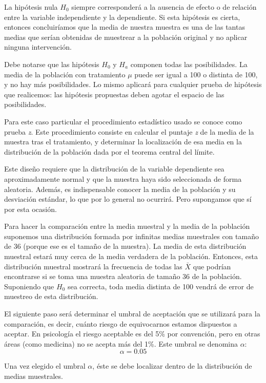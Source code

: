 \documentclass[a4paper,12pt]{article}
\begin{document}
La hipótesis nula $H_{0}$ siempre corresponderá a la ausencia de efecto o de relación entre la variable independiente y la dependiente. Si esta hipótesis es cierta, entonces concluiríamos que la media de nuestra muestra es una de las tantas medias que serían obtenidas de muestrear a la población original y no aplicar ninguna intervención.

Debe notarse que las hipótesis $H_{0}$ y $H_{a}$ componen todas las posibilidades. La media de la población con tratamiento $\mu$ puede ser igual a 100 o distinta de 100, y no hay más posibilidades. Lo mismo aplicará para cualquier prueba de hipótesis que realicemos: las hipótesis propuestas deben agotar el espacio de las posibilidades.

Para este caso particular el procedimiento estadístico usado se conoce como prueba {\itshape z}. Este procedimiento consiste en calcular el puntaje {\itshape z} de la media de la muestra tras el tratamiento, y determinar la localización de esa media en la distribución de la población dada por el teorema central del límite.

Este diseño requiere que la distribución de la variable dependiente sea aproximadamente normal y que la muestra haya sido seleccionada de forma aleatoria. Además, es indispensable conocer la media de la población y su desviación estándar, lo que por lo general no ocurrirá. Pero supongamos que sí por esta ocasión.

Para hacer la comparación entre la media muestral y la media de la población suponemos una distribución formada por infinitas medias muestrales con tamaño de 36 (porque ese es el tamaño de la muestra). La media de esta distribución muestral estará muy cerca de la media verdadera de la población. Entonces, esta distribución muestral mostrará la frecuencia de todas las $\bar{X}$ que podrían encontrarse si se toma una muestra aleatoria de tamaño 36 de la población. Suponiendo que $H_{0}$ sea correcta, toda media distinta de 100 vendrá de error de muestreo de esta distribución.

El siguiente paso será determinar el umbral de aceptación que se utilizará para la comparación, es decir, cuánto riesgo de equivocarnos estamos dispuestos a aceptar. En psicología el riesgo aceptable es del 5\% por convención, pero en otras áreas (como medicina) no se acepta más del 1\%. Este umbral se denomina $\alpha$:
\[
  \alpha = 0.05
\]

Una vez elegido el umbral $\alpha$, éste se debe localizar dentro de la distribución de medias muestrales.
\end{document}
